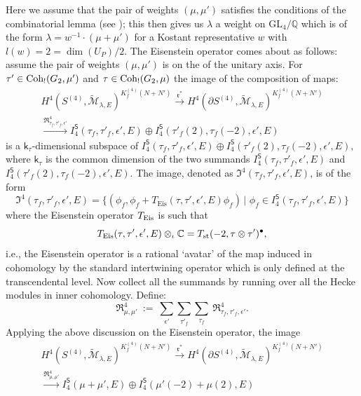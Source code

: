 \documentclass[11pt]{amsart}
\newcommand{\GL}{\mathrm{GL}}
\newcommand{\mirf}[1]{K_f^{(4)}(#1)}
\begin{document}
 Here we assume that the pair of weights $(\mu, \mu')$ satisfies the conditions of the combinatorial lemma (see \cite[Lem.\,7.14]{harder-raghuram}); 
this then gives us $\lambda$ a weight on $\GL_4/\mathbb{Q}$ which is of the form 
$\lambda = w^{-1}\cdot(\mu+\mu')$ for a Kostant representative $w$ with $l(w) = 2 = \dim(U_P)/2$. The Eisenstein operator comes about as follows: 
assume the pair of weights $(\mu,\mu')$ is on the  of the unitary axis. 
For $\tau' \in \textup{Coh}_!(G_2, \mu')$ and $\tau \in \textup{Coh}_!(G_2, \mu)$ the image of the composition of maps:
	\begin{multline*}
		H^{4}(S^{(4)}, \widetilde{\mathcal{M}}_{\lambda, E})^{\mirf{N+N'}} \xrightarrow{\mathfrak{r}^*} 
		H^4(\partial S^{(4)}, \widetilde{\mathcal{M}}_{\lambda, E})^{\mirf{N+N'}}\\ 
		\xrightarrow{\mathfrak{R}^4_{\tau_f, \tau'_f, \epsilon'}}
		 I_4^\mathsf{S}(\tau_f, \tau'_f, \epsilon',E) \oplus I_4^{\mathsf{S}}(\tau'_f(2), \tau_f(-2), \epsilon',E)
	\end{multline*}
is a $\mathsf{k}_{\tau}$-dimensional subspace of $I_4^\mathsf{S}(\tau_f, \tau'_f, \epsilon',E) \oplus I_4^{\mathsf{S}}(\tau'_f(2), \tau_f(-2), \epsilon',E),$ 
where $\mathsf{k}_\tau$ is the common dimension of the two summands $I_4^\mathsf{S}(\tau_f, \tau'_f, \epsilon',E)$ and  
$I_4^{\mathsf{S}}(\tau'_f(2), \tau_f(-2), \epsilon',E).$ The image, denoted as $\mathfrak{I}^4(\tau_f,\tau'_f,\epsilon',E)$, is of the form
	\begin{equation*}
		\mathfrak{I}^4(\tau_f,\tau'_f,\epsilon',E)= \{ (\phi_f , \phi_f + T_{\text{Eis}}(\tau, \tau', \epsilon',E) \phi_f ) \,|\,\, \phi_f \in I_4^\mathsf{S}(\tau_f, \tau'_f, \epsilon',E)\}
	\end{equation*}
where the Eisenstein operator $T_{\rm Eis}$ is such that
	\begin{equation*}
		T_{\textup{Eis}}(\tau,\tau',\epsilon', E) \otimes_{\iota} \mathbb{C} = T_{\textup{st}}(-2, \tau \otimes \tau')^\bullet, 
	\end{equation*}
i.e., the Eisenstein operator is a rational `avatar' of the map induced in cohomology by the standard intertwining operator which is only defined at the transcendental level. 
Now collect all the summands by running over all the Hecke modules in inner cohomology. Define: 
$$
\mathfrak{R}^4_{\mu,\mu'} \ := \ \sum_{\epsilon'} \sum_{\tau'_f} \sum_{\tau_f} \ \mathfrak{R}^4_{\tau_f, \tau'_f, \epsilon'}.
$$ 
Applying the above discussion on the Eisenstein operator, the image 
	\begin{multline}
		H^{4}(S^{(4)}, \widetilde{\mathcal{M}}_{\lambda, E})^{\mirf{N+N'}} \xrightarrow{\mathfrak{r}^*} H^4(\partial S^{(4)}, \widetilde{\mathcal{M}}_{\lambda, E})^{\mirf{N+N'}}\\ \xrightarrow{\mathfrak{R}^4_{\mu,\mu'}}
	I_4^\mathsf{S}(\mu+\mu',E) \oplus 	I_4^{\mathsf{S}}(\mu'(-2)+\mu(2),E) \label{eqn: third-integral-structure}
	\end{multline}
\end{document}
